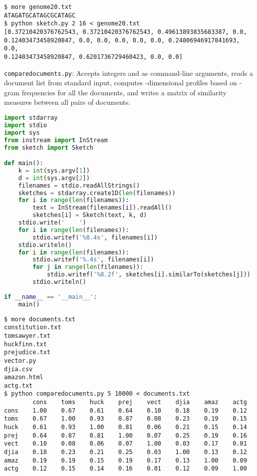 \documentclass[8pt,a4paper,compress,handout]{beamer}
\begin{document}
\begin{frame}[fragile]
\begin{lstlisting}[language={}]
$ more genome20.txt
ATAGATGCATAGCGCATAGC
$ python sketch.py 2 16 < genome20.txt 
[0.37210420376762543, 0.37210420376762543, 0.49613893835683387, 0.0, 
0.12403473458920847, 0.0, 0.0, 0.0, 0.0, 0.0, 0.24806946917841693, 0.0, 
0.12403473458920847, 0.6201736729460423, 0.0, 0.0]
\end{lstlisting}
\end{frame}

\begin{frame}[fragile]
\begin{framed}
\tiny \lstinline{comparedocuments.py}: Accepts integers  and  as command-line arguments, reads a document list from standard input, computes -dimensional profiles based on -gram frequencies for all the documents, and writes a matrix of similarity measures between all pairs of documents.
\end{framed}

\begin{lstlisting}[language=Python]
import stdarray
import stdio
import sys
from instream import InStream
from sketch import Sketch

def main():
    k = int(sys.argv[1])
    d = int(sys.argv[2])
    filenames = stdio.readAllStrings()
    sketches = stdarray.create1D(len(filenames))
    for i in range(len(filenames)):
        text = InStream(filenames[i]).readAll()
        sketches[i] = Sketch(text, k, d)
    stdio.write('    ')
    for i in range(len(filenames)):
        stdio.writef('%8.4s', filenames[i])
    stdio.writeln()
    for i in range(len(filenames)):
        stdio.writef('%.4s', filenames[i])
        for j in range(len(filenames)):
            stdio.writef('%8.2f', sketches[i].similarTo(sketches[j]))
        stdio.writeln()
    
if __name__ == '__main__':
    main()
\end{lstlisting}
\end{frame}

\begin{frame}[fragile]
\begin{lstlisting}[language={}]
$ more documents.txt
constitution.txt
tomsawyer.txt
huckfinn.txt
prejudice.txt
vector.py
djia.csv
amazon.html
actg.txt
$ python comparedocuments.py 5 10000 < documents.txt
        cons    toms    huck    prej    vect    djia    amaz    actg
cons    1.00    0.67    0.61    0.64    0.10    0.18    0.19    0.12
toms    0.67    1.00    0.93    0.87    0.08    0.23    0.19    0.15
huck    0.61    0.93    1.00    0.81    0.06    0.21    0.15    0.14
prej    0.64    0.87    0.81    1.00    0.07    0.25    0.19    0.16
vect    0.10    0.08    0.06    0.07    1.00    0.03    0.17    0.01
djia    0.18    0.23    0.21    0.25    0.03    1.00    0.13    0.12
amaz    0.19    0.19    0.15    0.19    0.17    0.13    1.00    0.09
actg    0.12    0.15    0.14    0.16    0.01    0.12    0.09    1.00
\end{lstlisting}
\end{frame}
\end{document}
